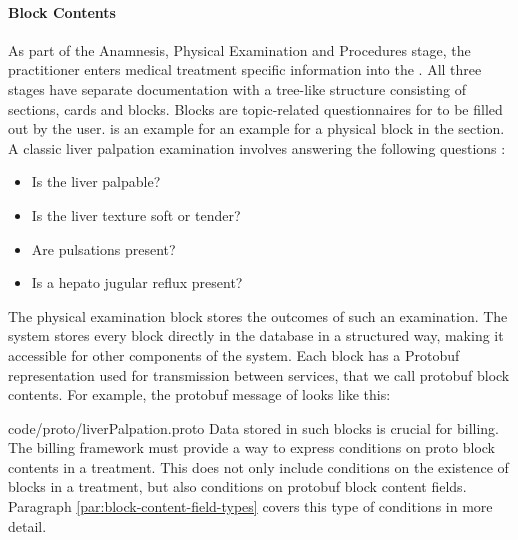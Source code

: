 \paragraph{Block Contents}
As part of the Anamnesis, Physical Examination and Procedures stage,
the practitioner enters medical treatment specific information into the \AVS.
All three stages have separate documentation with a tree-like structure consisting of sections, cards and blocks.
Blocks are topic-related questionnaires for to be filled out by the user.
 is an example for an example for a physical block in the  section.
A classic liver palpation examination involves answering the following questions \cite{wolf1990evaluation}:
\begin{itemize}
    \item Is the liver palpable?
    \item Is the liver texture soft or tender?
    \item Are pulsations present?
    \item Is a hepato jugular reflux present?
\end{itemize}
The physical examination block  stores the outcomes of such an examination.
The system stores every block directly in the database in a structured way, making it accessible for other components of the system.
Each block has a Protobuf representation used for transmission between services, that we call protobuf block contents.
For example, the protobuf message of  looks like this:

{code/proto/liverPalpation.proto}
Data stored in such blocks is crucial for billing.
The billing framework must provide a way to express conditions on proto block contents in a treatment.
This does not only include conditions on the existence of blocks in a treatment, but also conditions on protobuf block content fields.
Paragraph \ref{par:block-content-field-types} covers this type of conditions in more detail.
